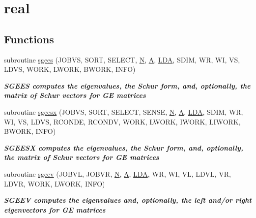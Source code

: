 \hypertarget{group__realGEeigen}{}\section{real}
\label{group__realGEeigen}
\subsection*{Functions}
\begin{DoxyCompactItemize}
\item 
subroutine \hyperlink{group__realGEeigen_ga0cd2fba843c9d04967c79a58f8d6e321}{sgees} (J\+O\+B\+V\+S, S\+O\+R\+T, S\+E\+L\+E\+C\+T, \hyperlink{polmisc_8c_a0240ac851181b84ac374872dc5434ee4}{N}, \hyperlink{classA}{A}, \hyperlink{example__user_8c_ae946da542ce0db94dced19b2ecefd1aa}{L\+D\+A}, S\+D\+I\+M, W\+R, W\+I, V\+S, L\+D\+V\+S, W\+O\+R\+K, L\+W\+O\+R\+K, B\+W\+O\+R\+K, I\+N\+F\+O)
\begin{DoxyCompactList}\small\item\em {\bfseries  S\+G\+E\+E\+S computes the eigenvalues, the Schur form, and, optionally, the matrix of Schur vectors for G\+E matrices} \end{DoxyCompactList}\item 
subroutine \hyperlink{group__realGEeigen_gac8e46bbcd7e259cdacfccbcfb575a392}{sgeesx} (J\+O\+B\+V\+S, S\+O\+R\+T, S\+E\+L\+E\+C\+T, S\+E\+N\+S\+E, \hyperlink{polmisc_8c_a0240ac851181b84ac374872dc5434ee4}{N}, \hyperlink{classA}{A}, \hyperlink{example__user_8c_ae946da542ce0db94dced19b2ecefd1aa}{L\+D\+A}, S\+D\+I\+M, W\+R, W\+I, V\+S, L\+D\+V\+S, R\+C\+O\+N\+D\+E, R\+C\+O\+N\+D\+V, W\+O\+R\+K, L\+W\+O\+R\+K, I\+W\+O\+R\+K, L\+I\+W\+O\+R\+K, B\+W\+O\+R\+K, I\+N\+F\+O)
\begin{DoxyCompactList}\small\item\em {\bfseries  S\+G\+E\+E\+S\+X computes the eigenvalues, the Schur form, and, optionally, the matrix of Schur vectors for G\+E matrices} \end{DoxyCompactList}\item 
subroutine \hyperlink{group__realGEeigen_ga104525b749278774f7b7f57195aa6798}{sgeev} (J\+O\+B\+V\+L, J\+O\+B\+V\+R, \hyperlink{polmisc_8c_a0240ac851181b84ac374872dc5434ee4}{N}, \hyperlink{classA}{A}, \hyperlink{example__user_8c_ae946da542ce0db94dced19b2ecefd1aa}{L\+D\+A}, W\+R, W\+I, V\+L, L\+D\+V\+L, V\+R, L\+D\+V\+R, W\+O\+R\+K, L\+W\+O\+R\+K, I\+N\+F\+O)
\begin{DoxyCompactList}\small\item\em {\bfseries  S\+G\+E\+E\+V computes the eigenvalues and, optionally, the left and/or right eigenvectors for G\+E matrices} \end{DoxyCompactList}\item 

\end{DoxyCompactItemize}
